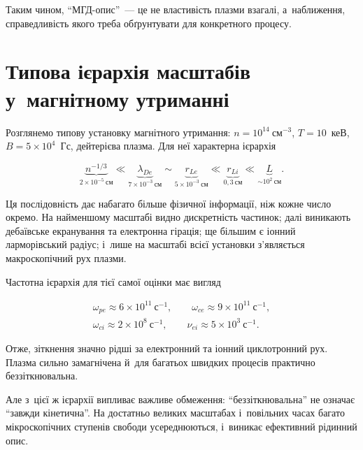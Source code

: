 Таким чином, \enquote{МГД-опис}~--- це не властивість плазми взагалі, а~наближення, справедливість якого треба обґрунтувати для конкретного
процесу.

\section{Типова ієрархія масштабів у~магнітному утриманні}

Розглянемо типову установку магнітного утримання:
$n=10^{14}~\mathrm{см}^{-3}$, $T=10$~кеВ,
$B=5\times10^{4}$~Гс, дейтерієва плазма. Для неї характерна ієрархія

\begin{equation*}
\underbrace{n^{-1/3}}_{2\times10^{-5}~\text{см}}
\ll
\underbrace{\lambda_{De}}_{7\times10^{-3}~\text{см}}
\sim
\underbrace{r_{Le}}_{5\times10^{-3}~\text{см}}
\ll
\underbrace{r_{Li}}_{0{,}3~\text{см}}
\ll
\underbrace{L}_{\sim10^{2}~\text{см}}.
\end{equation*}

Ця послідовність дає набагато більше фізичної інформації, ніж кожне
число окремо. На найменшому масштабі видно дискретність частинок;
далі виникають дебаївське екранування та електронна гірація; ще більшим
є іонний ларморівський радіус; і~лише на масштабі всієї установки
з'являється макроскопічний рух плазми.

Частотна ієрархія для тієї самої оцінки має вигляд

\begin{equation*}
\begin{gathered}
\omega_{pe}\approx6\times10^{11}~\mathrm{с}^{-1},
\qquad
\omega_{ce}\approx9\times10^{11}~\mathrm{с}^{-1},\\
\omega_{ci}\approx2\times10^{8}~\mathrm{с}^{-1},
\qquad
\nu_{ei}\approx5\times10^{3}~\mathrm{с}^{-1}.
\end{gathered}
\end{equation*}

Отже, зіткнення значно рідші за електронний та іонний циклотронний
рух. Плазма сильно замагнічена й~для багатьох швидких процесів
практично беззіткнювальна.

Але з~цієї ж ієрархії випливає важливе обмеження: \enquote{беззіткнювальна}
не означає \enquote{завжди кінетична}. На достатньо великих масштабах і~повільних часах багато мікроскопічних ступенів свободи усереднюються,
і~виникає ефективний рідинний опис.

